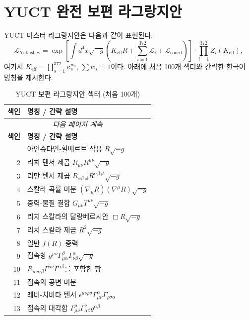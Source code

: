 \documentclass[11pt,a4paper]{article}
\begin{document}
	\section{YUCT 완전 보편 라그랑지안}
	YUCT 마스터 라그랑지안은 다음과 같이 표현된다:
	\begin{equation}
		\mathcal{L}_{\text{Yakushev}} = \exp\left[\int d^4x\sqrt{-g}\left(K_{\mathrm{eff}}R + \sum_{i=1}^{372}\mathcal{L}_i + \mathcal{L}_{\text{coord}}\right)\right] \cdot \prod_{i=1}^{372} Z_i(K_{\mathrm{eff}}),
	\end{equation}
	여기서 $K_{\mathrm{eff}} = \prod_{s=1}^{372} \kappa_s^{w_s}$, $\sum w_s = 1$이다. 아래에 처음 100개 섹터와 간략한 한국어 명칭을 제시한다.
	\scriptsize
	\begin{longtable}{r l}
		\caption{YUCT 보편 라그랑지안 섹터 (처음 100개)}\label{tab:sectors}\\
		\toprule
		\textbf{색인} & \textbf{명칭 / 간략 설명} \\
		\midrule
		\endfirsthead
		\multicolumn{2}{c}{\textit{다음 페이지 계속}}\\
		\toprule
		\textbf{색인} & \textbf{명칭 / 간략 설명} \\
		\midrule
		\endhead
		\bottomrule
		\endfoot
		1 & 아인슈타인‑힐베르트 작용 $R\sqrt{-g}$ \\
		2 & 리치 텐서 제곱 $R_{\mu\nu}R^{\mu\nu}\sqrt{-g}$ \\
		3 & 리만 텐서 제곱 $R_{\alpha\beta\gamma\delta}R^{\alpha\beta\gamma\delta}\sqrt{-g}$ \\
		4 & 스칼라 곡률 미분 $(\nabla_\mu R)(\nabla^\mu R)\sqrt{-g}$ \\
		5 & 중력‑물질 결합 $G_{\mu\nu}T^{\mu\nu}\sqrt{-g}$ \\
		6 & 리치 스칼라의 달랑베르시안 $\Box R\sqrt{-g}$ \\
		7 & 리치 스칼라 제곱 $R^2\sqrt{-g}$ \\
		8 & 일반 $f(R)$ 중력 \\
		9 & 접속항 $g^{\mu\nu}\Gamma^{\beta}_{\mu\alpha}\Gamma^{\alpha}_{\nu\beta}\sqrt{-g}$ \\
		10 & $R_{\mu\nu\alpha\beta}\Gamma^{\mu\nu}\Gamma^{\alpha\beta}$를 포함한 항 \\
		11 & 접속의 공변 미분 \\
		12 & 레비‑치비타 텐서 $\epsilon^{\mu\nu\rho\sigma}\Gamma^{\alpha}_{\mu\nu}\Gamma_{\rho\sigma\alpha}$ \\
		13 & 접속의 대각합 $\Gamma^{\mu}_{\mu\nu}\Gamma^{\nu}_{\alpha\beta}g^{\alpha\beta}$ \\

\end{longtable}
\end{document}
